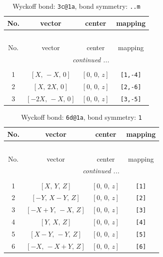 \documentclass[fleqn,8pt]{jsarticle}
\begin{document}
\renewcommand{\arraystretch}{1.2}
\begin{longtable}{cccc}
\caption{Wyckoff bond: {\tt 3c@1a}, bond symmetry: {\tt ..m}}
 \\
 \hline \hline
No. & vector & center & mapping \\ \hline \endfirsthead

\multicolumn{3}{l}{\tablename\ \thetable{}} \\
 \hline \hline
No. & vector & center & mapping \\ \hline \endhead

 \hline \hline
\multicolumn{3}{r}{\footnotesize\it continued ...} \\ \endfoot

 \hline \hline
\multicolumn{3}{r}{} \\ \endlastfoot

1 & $\left[ X,\, - X,\, 0 \right]$ & $\left[ 0,\, 0,\, z \right]$ & {\tt [1,-4]} \\ \hline
2 & $\left[ X,\, 2 X,\, 0 \right]$ & $\left[ 0,\, 0,\, z \right]$ & {\tt [2,-6]} \\ \hline
3 & $\left[ - 2 X,\, - X,\, 0 \right]$ & $\left[ 0,\, 0,\, z \right]$ & {\tt [3,-5]} \\
\end{longtable}
\renewcommand{\arraystretch}{1.2}
\begin{longtable}{cccc}
\caption{Wyckoff bond: {\tt 6d@1a}, bond symmetry: {\tt 1}}
 \\
 \hline \hline
No. & vector & center & mapping \\ \hline \endfirsthead

\multicolumn{3}{l}{\tablename\ \thetable{}} \\
 \hline \hline
No. & vector & center & mapping \\ \hline \endhead

 \hline \hline
\multicolumn{3}{r}{\footnotesize\it continued ...} \\ \endfoot

 \hline \hline
\multicolumn{3}{r}{} \\ \endlastfoot

1 & $\left[ X,\, Y,\, Z \right]$ & $\left[ 0,\, 0,\, z \right]$ & {\tt [1]} \\ \hline
2 & $\left[ - Y,\, X - Y,\, Z \right]$ & $\left[ 0,\, 0,\, z \right]$ & {\tt [2]} \\ \hline
3 & $\left[ - X + Y,\, - X,\, Z \right]$ & $\left[ 0,\, 0,\, z \right]$ & {\tt [3]} \\ \hline
4 & $\left[ Y,\, X,\, Z \right]$ & $\left[ 0,\, 0,\, z \right]$ & {\tt [4]} \\ \hline
5 & $\left[ X - Y,\, - Y,\, Z \right]$ & $\left[ 0,\, 0,\, z \right]$ & {\tt [5]} \\ \hline
6 & $\left[ - X,\, - X + Y,\, Z \right]$ & $\left[ 0,\, 0,\, z \right]$ & {\tt [6]} \\
\end{longtable}
\end{document}

